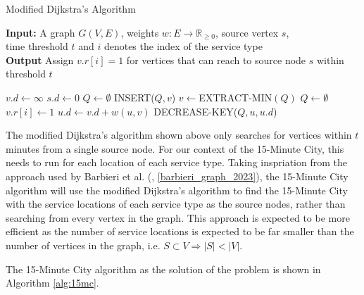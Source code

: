 \begin{algorithm}[H]
    \caption{Modified Dijkstra's Algorithm} \label{alg:modified_dijsktra}
    \textbf{Input:} A graph $G(V,E)$, weights $w:E\rightarrow\mathbb{R}_{\geq 0}$, source vertex $s$, \\  time threshold $t$ and $i$ denotes the index of the service type\\
    \textbf{Output} Assign $v.r[i]=1$ for vertices that can reach to source node $s$ within threshold $t$ %
    \begin{algorithmic}
            \State $v.d\gets\infty$
        \EndFor
        \State $s.d\gets 0$
        \State $Q\gets\emptyset$
            \State INSERT($Q,v$)
        \EndFor
            \State $v\gets$EXTRACT-MIN$(Q)$
                \State $Q\gets\emptyset$ 
            \Else
                \State $v.r[i] \gets 1 $
                        \State $u.d\gets v.d+w(u,v)$
                        \State DECREASE-KEY($Q,u,u.d$)
                    \EndIf
                \EndFor
            \EndIf
        \EndWhile
    \end{algorithmic}
\end{algorithm}

The modified Dijkstra's algorithm shown above only searches for vertices within $t$ minutes from a single source node. For our context of the 15-Minute City, this needs to run for each location of each service type. Taking inspriation from the approach used by Barbieri et al. (\cite{barbieri_graph_2023}, \ref{barbieri_graph_2023}), the 15-Minute City algorithm will use the modified Dijkstra's algorithm to find the 15-Minute City with the service locations of each service type as the source nodes, rather than searching from every vertex in the graph. This approach is expected to be more efficient as the number of service locations is expected to be far smaller than the number of vertices in the graph, $\text{i.e. }S\subset V\Rightarrow|S|<|V|$.

The 15-Minute City algorithm as the solution of the problem is shown in Algorithm \ref{alg:15mc}.

